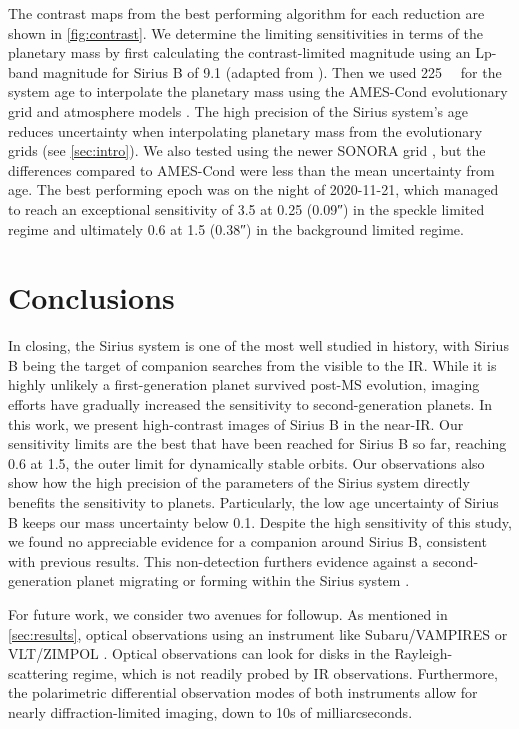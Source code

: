\documentclass[twocolumn,linenumbers]{aastex631}
\begin{document}
The contrast maps from the best performing algorithm for each reduction are shown in \cref{fig:contrast}. We determine the limiting sensitivities in terms of the planetary mass by first calculating the contrast-limited magnitude using an Lp-band magnitude for Sirius B of 9.1 (adapted from \citealp{bonnet-bidaud_adonis_2008}). Then we used \qty{225}{\mega\year} for the system age to interpolate the planetary mass using the AMES-Cond evolutionary grid and atmosphere models \citep{allard_models_2012}. The high precision of the Sirius system's age reduces uncertainty when interpolating planetary mass from the evolutionary grids (see \cref{sec:intro}). We also tested using the newer SONORA grid \citep{marley_mark_2018_1309035,marley_sonora_2021}, but the differences compared to AMES-Cond were less than the mean uncertainty from age. The best performing epoch was on the night of 2020-11-21, which managed to reach an exceptional sensitivity of \qty{3.5}{\jupitermass} at \qty{0.25}{\au} (\ang{;;0.09}) in the speckle limited regime and ultimately \qty{0.6}{\jupitermass} at \qty{1.5}{\au} (\ang{;;0.38}) in the background limited regime.

\section{Conclusions} \label{sec:conclusion}

In closing, the Sirius system is one of the most well studied in history, with Sirius B being the target of companion searches from the visible to the IR. While it is highly unlikely a first-generation planet survived post-MS evolution, imaging efforts have gradually increased the sensitivity to second-generation planets. In this work, we present high-contrast images of Sirius B in the near-IR. Our sensitivity limits are the best that have been reached for Sirius B so far, reaching \qty{0.6}{\jupitermass} at \qty{1.5}{\au}, the outer limit for dynamically stable orbits. Our observations also show how the high precision of the parameters of the Sirius system directly benefits the sensitivity to planets. Particularly, the low age uncertainty of Sirius B keeps our mass uncertainty below \qty{0.1}{\jupitermass}. Despite the high sensitivity of this study, we found no appreciable evidence for a companion around Sirius B, consistent with previous results. This non-detection furthers evidence against a second-generation planet migrating or forming within the Sirius system \citep{vigan_high-contrast_2015}.

For future work, we consider two avenues for followup. As mentioned in \cref{sec:results}, optical observations using an instrument like Subaru/VAMPIRES \citep{norris_vampires_2014} or VLT/ZIMPOL \citep{schmid_zimpol_2018}. Optical observations can look for disks in the Rayleigh-scattering regime, which is not readily probed by IR observations. Furthermore, the polarimetric differential observation modes of both instruments allow for nearly diffraction-limited imaging, down to 10s of milliarcseconds.
\end{document}
